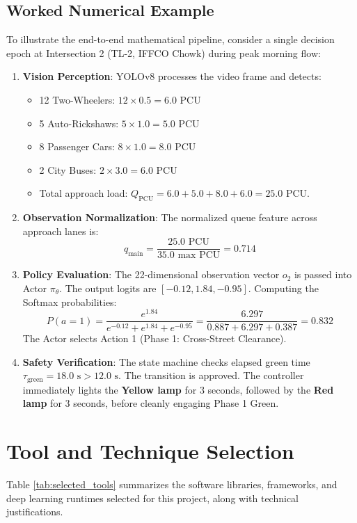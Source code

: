 \subsection{Worked Numerical Example}
To illustrate the end-to-end mathematical pipeline, consider a single decision epoch at Intersection 2 (TL-2, IFFCO Chowk) during peak morning flow:
\begin{enumerate}
    \item \textbf{Vision Perception}: YOLOv8 processes the video frame and detects:
    \begin{itemize}
        \item 12 Two-Wheelers: $12 \times 0.5 = 6.0$ PCU
        \item 5 Auto-Rickshaws: $5 \times 1.0 = 5.0$ PCU
        \item 8 Passenger Cars: $8 \times 1.0 = 8.0$ PCU
        \item 2 City Buses: $2 \times 3.0 = 6.0$ PCU
        \item Total approach load: $Q_{\text{PCU}} = 6.0 + 5.0 + 8.0 + 6.0 = 25.0$ PCU.
    \end{itemize}
    \item \textbf{Observation Normalization}: The normalized queue feature across approach lanes is:
    \begin{equation}
    q_{\text{main}} = \frac{25.0 \text{ PCU}}{35.0 \text{ max PCU}} = 0.714
    \end{equation}
    \item \textbf{Policy Evaluation}: The 22-dimensional observation vector $o_2$ is passed into Actor $\pi_\theta$. The output logits are $[-0.12, 1.84, -0.95]$. Computing the Softmax probabilities:
    \begin{equation}
    P(a = 1) = \frac{e^{1.84}}{e^{-0.12} + e^{1.84} + e^{-0.95}} = \frac{6.297}{0.887 + 6.297 + 0.387} = 0.832
    \end{equation}
    The Actor selects Action 1 (Phase 1: Cross-Street Clearance).
    \item \textbf{Safety Verification}: The state machine checks elapsed green time $\tau_{\text{green}} = 18.0\text{ s} > 12.0\text{ s}$. The transition is approved. The controller immediately lights the \textbf{Yellow lamp} for 3 seconds, followed by the \textbf{Red lamp} for 3 seconds, before cleanly engaging Phase 1 Green.
\end{enumerate}

\section{Tool and Technique Selection}
\label{sec:tool_selection}
Table \ref{tab:selected_tools} summarizes the software libraries, frameworks, and deep learning runtimes selected for this project, along with technical justifications.

